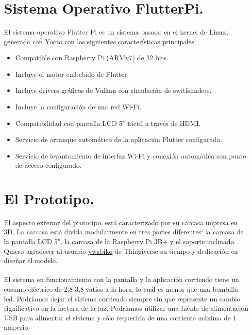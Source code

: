 \section{Sistema Operativo FlutterPi.}\label{sec:flutterpi}

\paragraph{}El sistema operativo Flutter Pi es un sistema basado en el kernel de Linux,
generado con Yocto con las siguientes características principales:

\begin{itemize}
    \item Compatible con Raspberry Pi (ARMv7) de 32 bits.
    \item Incluye el motor embebido de Flutter.
    \item Incluye drivers gráficos de Vulkan con simulación de switfshaders.
    \item Incluye la configuración de una red Wi-Fi.
    \item Compatibilidad con pantalla LCD 5" táctil a través de HDMI.
    \item Servicio de arranque automático de la aplicación Flutter configurada.
    \item Servicio de levantamiento de interfaz Wi-Fi y conexión automática con
    punto de acceso configurado.
\end{itemize}

\section{El Prototipo.}\label{sec:prototipo}

\paragraph{}El aspecto exterior del prototipo, está caracterizado por su carcasa impresa
en 3D. La carcasa está divida modularmente en tres partes diferentes: la carcasa de la
pantalla LCD 5", la carcasa de la Raspberry Pi 3B+ y el soporte inclinado. Quiero
agradecer al usuario \href{https://www.thingiverse.com/thing:3444545}{ywabiko} de
Thingiverse su tiempo y dedicación en diseñar el modelo.

\paragraph{}El sistema en funcionamiento con la pantalla y la aplicación corriendo
tiene un cosumo eléctrico de 2,8-3,8 vatios a la hora, lo cuál es menos que una bombilla
led. Podríamos dejar el sistema corriendo siempre sin que represente un cambio significativo
en la factura de la luz. Podríamos utilizar una fuente de alimentación USB para alimentar
el sistema y sólo requeriría de una corriente máxima de 1 amperio.

